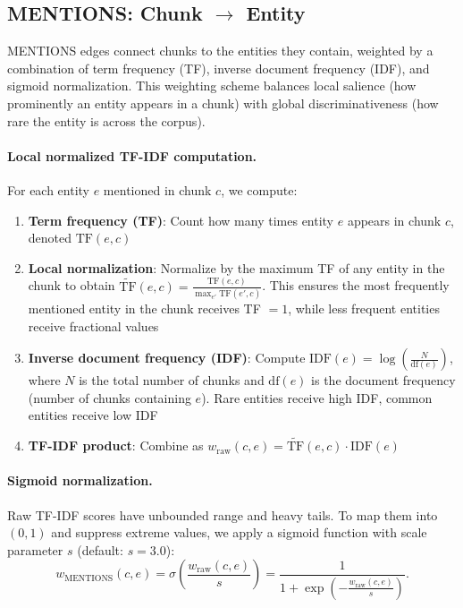 \documentclass[10pt]{article}
\begin{document}
\subsection{MENTIONS: Chunk $\to$ Entity}

MENTIONS edges connect chunks to the entities they contain, weighted by a combination of term frequency (TF), inverse document frequency (IDF), and sigmoid normalization. This weighting scheme balances local salience (how prominently an entity appears in a chunk) with global discriminativeness (how rare the entity is across the corpus).

\paragraph{Local normalized TF-IDF computation.} For each entity $e$ mentioned in chunk $c$, we compute:

\begin{enumerate}[itemsep=2pt]
    \item \textbf{Term frequency (TF)}: Count how many times entity $e$ appears in chunk $c$, denoted $\text{TF}(e,c)$
    \item \textbf{Local normalization}: Normalize by the maximum TF of any entity in the chunk to obtain $\widetilde{\text{TF}}(e,c) = \frac{\text{TF}(e,c)}{\max_{e'} \text{TF}(e',c)}$. This ensures the most frequently mentioned entity in the chunk receives TF $= 1$, while less frequent entities receive fractional values
    \item \textbf{Inverse document frequency (IDF)}: Compute $\text{IDF}(e) = \log\left(\frac{N}{\text{df}(e)}\right)$, where $N$ is the total number of chunks and $\text{df}(e)$ is the document frequency (number of chunks containing $e$). Rare entities receive high IDF, common entities receive low IDF
    \item \textbf{TF-IDF product}: Combine as $w_{\text{raw}}(c,e) = \widetilde{\text{TF}}(e,c) \cdot \text{IDF}(e)$
\end{enumerate}

\paragraph{Sigmoid normalization.} Raw TF-IDF scores have unbounded range and heavy tails. To map them into $(0,1)$ and suppress extreme values, we apply a sigmoid function with scale parameter $s$ (default: $s=3.0$):
\[
w_{\text{MENTIONS}}(c,e) = \sigma\left(\frac{w_{\text{raw}}(c,e)}{s}\right) = \frac{1}{1 + \exp\left(-\frac{w_{\text{raw}}(c,e)}{s}\right)}.
\]
\end{document}
